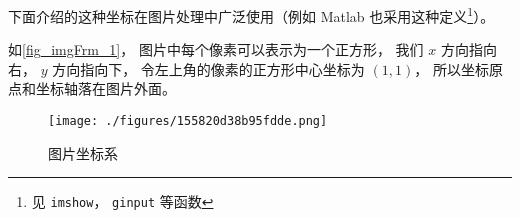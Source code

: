 
下面介绍的这种坐标在图片处理中广泛使用（例如 Matlab 也采用这种定义\footnote{见 \lstinline|imshow|， \lstinline|ginput| 等函数}）。

如\autoref{fig_imgFrm_1}， 图片中每个像素可以表示为一个正方形， 我们 $x$ 方向指向右， $y$ 方向指向下， 令左上角的像素的正方形中心坐标为 $(1, 1)$， 所以坐标原点和坐标轴落在图片外面。

\begin{figure}[ht]
\centering
\texttt{[image: ./figures/155820d38b95fdde.png]}
\caption{图片坐标系} \label{fig_imgFrm_1}
\end{figure}
